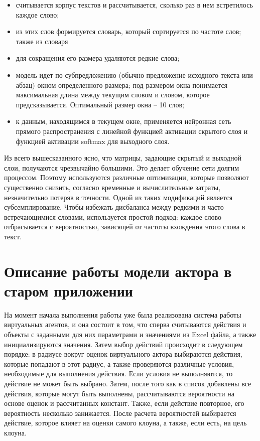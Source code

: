 \begin{itemize}
  \item считывается корпус текстов и рассчитывается, сколько раз в нем встретилось каждое слово; 
  \item из этих слов формируется словарь, который сортируется по частоте слов; также из словаря
  \item для сокращения его размера удаляются редкие слова;
  \item модель идет по субпредложению (обычно предложение исходного текста или абзац) окном определенного размера; под размером окна понимается максимальная длина между текущим словом и словом, которое предсказывается. Оптимальный размер окна – 10 слов; 
  \item	к данным, находящимся в текущем окне, применяется нейронная сеть прямого распространения с линейной функцией активации скрытого слоя и функцией активации softmax для выходного слоя.
\end{itemize}

Из всего вышесказанного ясно, что матрицы, задающие скрытый и выходной слои, получаются чрезвычайно большими. 
Это делает обучение сети долгим процессом. Поэтому используются различные оптимизации, которые позволяют существенно 
снизить, согласно \cite{neural03} временные и вычислительные затраты, незначительно потеряв в точности. Одной из таких модификаций является субсемплирование.
Чтобы избежать дисбаланса между редкими и часто встречающимися словами, используется простой подход: каждое слово 
отбрасывается с вероятностью, зависящей от частоты вхождения этого слова в текст.

\section{Описание работы модели актора в старом приложении}

На момент начала выполнения работы уже была реализована система работы виртуальных агентов, и она состоит в том, что сперва 
считываются действия и объекты с заданными для них параметрами и значениями из Excel файла, а также инициализируются значения. 
Затем выбор действий происходит в следующем порядке: в радиусе вокруг оценок виртуального актора выбираются действия, которые 
попадают в этот радиус, а также проверяются различные условия, необходимые для выполнения действия. Если условия не выполняются, 
то действие не может быть выбрано. Затем, после того как в список добавлены все действия, которые могут быть выполнены, рассчитываются 
вероятности на основе оценок и рассчитанных констант. Также, если действие повторное, его вероятность несколько занижается. 
После расчета вероятностей выбирается действие, которое влияет на оценки самого клоуна, а также, если есть, на цель клоуна. 


